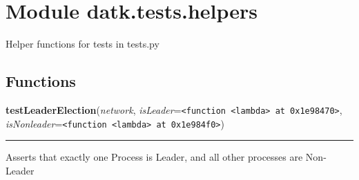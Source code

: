%
%
%


\section{Module datk.tests.helpers}

    \label{datk:tests:helpers}
Helper functions for tests in tests.py



  \subsection{Functions}

    \label{datk:tests:helpers:testLeaderElection}

    \vspace{0.5ex}

\hspace{.8\funcindent}\begin{boxedminipage}{\funcwidth}

    \raggedright \textbf{testLeaderElection}(\textit{network}, \textit{isLeader}={\tt {\textless}function {\textless}lambda{\textgreater} at 0x1e98470{\textgreater}}, \textit{isNonleader}={\tt {\textless}function {\textless}lambda{\textgreater} at 0x1e984f0{\textgreater}})

    \vspace{-1.5ex}

    \rule{\textwidth}{0.5\fboxrule}
\setlength{\parskip}{2ex}
    Asserts that exactly one Process is Leader, and all other processes are
    Non-Leader

\setlength{\parskip}{1ex}
    \end{boxedminipage}

